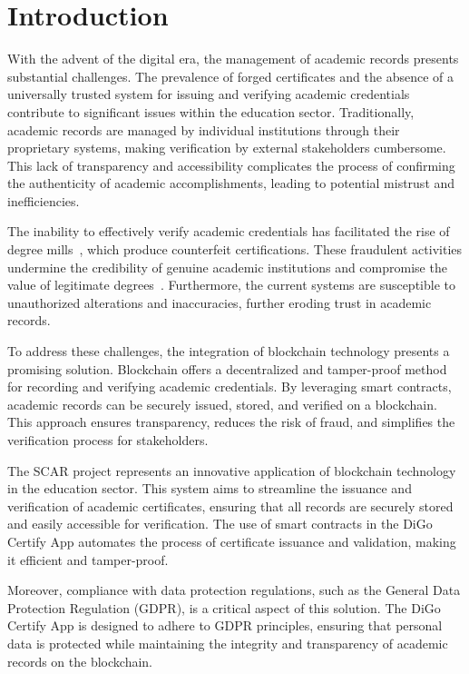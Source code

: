 %
%
\chapter{Introduction}\label{chap:introduction}

With the advent of the digital era, the management of academic records presents substantial challenges. The prevalence of forged certificates and the absence of a universally trusted system for issuing and verifying academic credentials contribute to significant issues within the education sector. Traditionally, academic records are managed by individual institutions through their proprietary systems, making verification by external stakeholders cumbersome. This lack of transparency and accessibility complicates the process of confirming the authenticity of academic accomplishments, leading to potential mistrust and inefficiencies.

The inability to effectively verify academic credentials has facilitated the rise of degree mills~\cite{saleh2020blockchain}, which produce counterfeit certifications. These fraudulent activities undermine the credibility of genuine academic institutions and compromise the value of legitimate degrees~\cite{muzammil2010corrupt}. Furthermore, the current systems are susceptible to unauthorized alterations and inaccuracies, further eroding trust in academic records.

To address these challenges, the integration of blockchain technology presents a promising solution. Blockchain offers a decentralized and tamper-proof method for recording and verifying academic credentials. By leveraging smart contracts, academic records can be securely issued, stored, and verified on a blockchain. This approach ensures transparency, reduces the risk of fraud, and simplifies the verification process for stakeholders.

The SCAR project represents an innovative application of blockchain technology in the education sector. This system aims to streamline the issuance and verification of academic certificates, ensuring that all records are securely stored and easily accessible for verification. The use of smart contracts in the DiGo Certify App automates the process of certificate issuance and validation, making it efficient and tamper-proof.

Moreover, compliance with data protection regulations, such as the General Data Protection Regulation (GDPR), is a critical aspect of this solution. The DiGo Certify App is designed to adhere to GDPR principles, ensuring that personal data is protected while maintaining the integrity and transparency of academic records on the blockchain.


